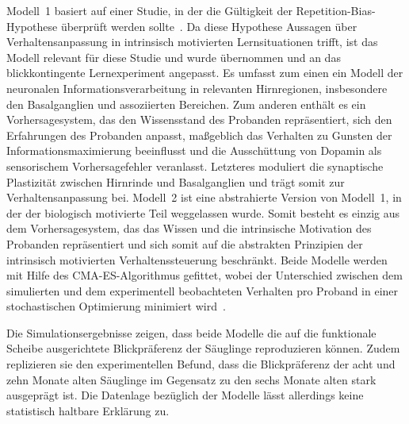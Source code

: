 \documentclass[a4paper]{scrreprt}
\begin{document}
Modell~1 basiert auf einer Studie, in der die G\"ultigkeit der Repetition-Bias-Hypothese \"uberpr\"uft werden sollte~\cite{bg13}. Da diese Hypothese Aussagen \"uber Verhaltensanpassung in intrinsisch motivierten Lernsituationen trifft, ist das Modell relevant f\"ur diese Studie und wurde \"ubernommen und an das blickkontingente Lernexperiment angepasst. Es umfasst zum einen ein Modell der neuronalen Informationsverarbeitung in relevanten Hirnregionen, insbesondere den Basalganglien und assoziierten Bereichen. Zum anderen enth\"alt es ein Vorhersagesystem, das den Wissensstand des Probanden repr\"asentiert, sich den Erfahrungen des Probanden anpasst, ma\ss geblich das Verhalten zu Gunsten der Informationsmaximierung beeinflusst und die Aussch\"uttung von Dopamin als sensorischem Vorhersagefehler veranlasst. Letzteres moduliert die synaptische Plastizit\"at zwischen Hirnrinde und Basalganglien und tr\"agt somit zur Verhaltensanpassung bei. 
Modell~2 ist eine abstrahierte Version von Modell~1, in der der biologisch motivierte Teil weggelassen wurde. Somit besteht es einzig aus dem Vorhersagesystem, das das Wissen und die intrinsische Motivation des Probanden repr\"asentiert und sich somit auf die abstrakten Prinzipien der intrinsisch motivierten Verhaltenssteuerung beschr\"ankt. Beide Modelle werden mit Hilfe des CMA-ES-Algorithmus gefittet, wobei der Unterschied zwischen dem simulierten und dem experimentell beobachteten Verhalten pro Proband in einer stochastischen Optimierung minimiert wird~\cite{hansen06}.

\quad

Die Simulationsergebnisse zeigen, dass beide Modelle die auf die funktionale Scheibe ausgerichtete Blickpr\"aferenz der S\"auglinge reproduzieren k\"onnen. Zudem replizieren sie den experimentellen Befund, dass die Blickpr\"aferenz der acht und zehn Monate alten S\"auglinge im Gegensatz zu den sechs Monate alten stark ausgepr\"agt ist. Die Datenlage bez\"uglich der Modelle l\"asst allerdings keine statistisch haltbare Erkl\"arung zu.
\end{document}
